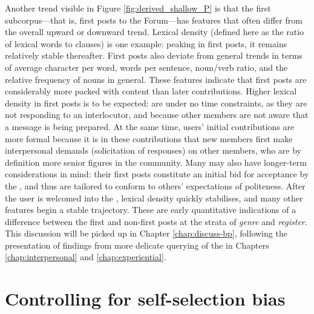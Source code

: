 
Another trend visible in Figure \ref{fig:derived_shallow_P} is that the first subcorpus---that is, first \glspl{post} to the \gls{Forum}---has features that often differ from the overall upward or downward trend. Lexical density (defined here as the ratio of lexical words to clauses) is one example: peaking in first \glspl{post}, it remains relatively stable thereafter. First \glspl{post} also deviate from general trends in terms of average character per word, words per sentence, noun\slash verb ratio, and the relative frequency of nouns in general. These features indicate that first \glspl{post} are considerably more packed with content than later contributions. Higher lexical density in first \glspl{post} is to be expected:  are under no time constraints, as they are not responding to an interlocutor, and because other \glspl{member} are not aware that a message is being prepared. At the same time, users' initial contributions are more formal because it is in these contributions that new \glspl{member} first make interpersonal demands (solicitation of responses) on other \glspl{member}, who are by definition more senior figures in the community. Many  may also have longer\hyp{}term considerations in mind: their first \glspl{post} constitute an initial bid for acceptance by the , and thus are tailored to conform to others' expectations of politeness. After the user is welcomed into the , lexical density quickly stabilises, and many other features begin a stable trajectory. These are early quantitative indications of a difference between the first and non-first \glspl{post} at the strata of \emph{genre} and \emph{register}. This discussion will be picked up in Chapter \ref{chap:discuss-bp}, following the presentation of findings from more delicate querying of the  in Chapters \ref{chap:interpersonal} and \ref{chap:experiential}.

\section{Controlling for self-selection bias}

